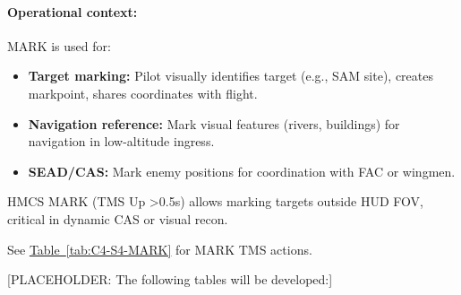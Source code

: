 \documentclass[11pt, a4paper, twoside]{report}
\newenvironment{hotastable}[1]{%
	\footnotesize
	\setlength{\tabcolsep}{3pt}
	\renewcommand{\arraystretch}{1.35}
	\begin{longtable}{L{1.00cm} L{0.90cm} L{0.90cm} L{3.30cm} L{6.40cm} L{1.40cm} L{1.60cm}}
		\caption{#1}\label{table.\thetable}\\
		\addtocontents{hotas}{\protect\contentsline{table}{\protect\numberline{\thetable}#1}{\thepage}{table.\thetable}}%
		\rowcolor{headerblue}
		\multicolumn{1}{>{\centering\arraybackslash}p{1.00cm}}{\textbf{\color{white}Mode}} &
		\multicolumn{1}{>{\centering\arraybackslash}p{0.90cm}}{\textbf{\color{white}Dir.}} &
		\multicolumn{1}{>{\centering\arraybackslash}p{0.90cm}}{\textbf{\color{white}Act.}} &
		\multicolumn{1}{>{\centering\arraybackslash}p{3.30cm}}{\textbf{\color{white}Function}} &
		\multicolumn{1}{>{\centering\arraybackslash}p{6.40cm}}{\textbf{\color{white}Effect / Nuance}} &
		\multicolumn{1}{>{\centering\arraybackslash}p{1.40cm}}{\textbf{\color{white}Dash34}} &
		\multicolumn{1}{>{\centering\arraybackslash}p{1.60cm}}{\textbf{\color{white}Train.}} \\
		\endfirsthead
		\rowcolor{headerblue}
		\multicolumn{1}{>{\centering\arraybackslash}p{1.00cm}}{\textbf{\color{white}Mode}} &
		\multicolumn{1}{>{\centering\arraybackslash}p{0.90cm}}{\textbf{\color{white}Dir.}} &
		\multicolumn{1}{>{\centering\arraybackslash}p{0.90cm}}{\textbf{\color{white}Act.}} &
		\multicolumn{1}{>{\centering\arraybackslash}p{3.30cm}}{\textbf{\color{white}Function}} &
		\multicolumn{1}{>{\centering\arraybackslash}p{6.40cm}}{\textbf{\color{white}Effect / Nuance}} &
		\multicolumn{1}{>{\centering\arraybackslash}p{1.40cm}}{\textbf{\color{white}Dash34}} &
		\multicolumn{1}{>{\centering\arraybackslash}p{1.60cm}}{\textbf{\color{white}Train.}} \\
		\endhead
		\multicolumn{7}{r}{\small\emph{Continued on next page}}\\
		\endfoot
		\endlastfoot
	}{%
	\end{longtable}
}
\newcommand{\tabref}[1]{\hyperref[#1]{Table~\ref*{#1}}}
\begin{document}
\paragraph{Operational context:}
MARK is used for:
\begin{itemize}
    \item \textbf{Target marking:} Pilot visually identifies target (e.g., SAM site), creates markpoint, shares coordinates with flight.
    \item \textbf{Navigation reference:} Mark visual features (rivers, buildings) for navigation in low-altitude ingress.
    \item \textbf{SEAD/CAS:} Mark enemy positions for coordination with FAC or wingmen.
\end{itemize}

HMCS MARK (TMS Up >0.5s) allows marking targets outside HUD FOV, critical in dynamic CAS or visual recon.

See \tabref{tab:C4-S4-MARK} for MARK TMS actions.


[PLACEHOLDER: The following tables will be developed:]


\end{document}
